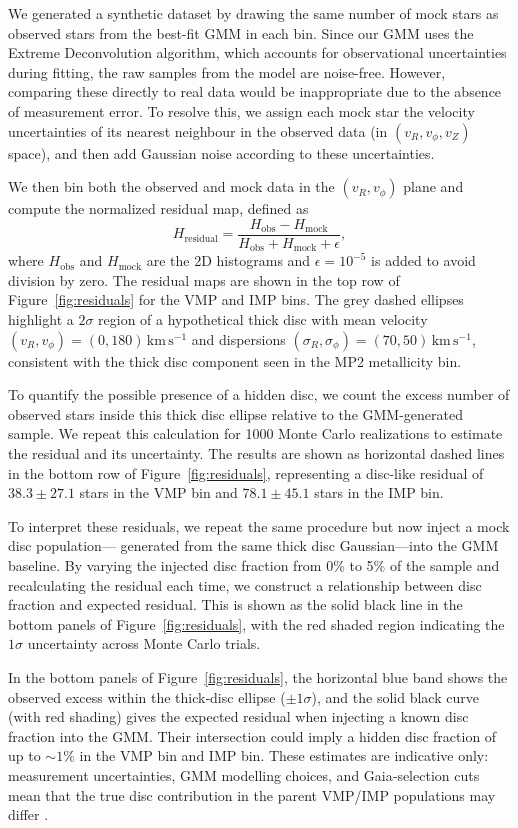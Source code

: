 \documentclass[a4paper,12pt]{article}
\begin{document}
We generated a synthetic dataset by drawing the same number of mock stars as observed stars from 
the best-fit GMM in each bin. Since our GMM uses the Extreme Deconvolution algorithm, which accounts 
for observational uncertainties during fitting, the raw samples from the model are noise-free. 
However, comparing these directly to real data would be inappropriate due to the absence of measurement 
error. To resolve this, we assign each mock star the velocity uncertainties of its nearest neighbour 
in the observed data (in $(v_R, v_\phi, v_Z)$ space), and then add Gaussian noise according to 
these uncertainties.

We then bin both the observed and mock data in the $(v_R, v_\phi)$ plane and compute the 
normalized residual map, defined as
\[
H_{\mathrm{residual}} = \frac{H_{\mathrm{obs}} - H_{\mathrm{mock}}}{H_{\mathrm{obs}} + H_{\mathrm{mock}} + \epsilon},
\]
where $H_{\mathrm{obs}}$ and $H_{\mathrm{mock}}$ are the 2D histograms and $\epsilon = 10^{-5}$ is added 
to avoid division by zero. The residual maps are shown in the top row of Figure~\ref{fig:residuals} for 
the VMP and IMP bins. The grey dashed ellipses highlight a $2\sigma$ region of a hypothetical thick disc 
with mean velocity $(v_R, v_\phi) = (0, 180)\,\mathrm{km\,s^{-1}}$ and dispersions $(\sigma_R, \sigma_\phi) 
= (70, 50)\,\mathrm{km\,s^{-1}}$, consistent with the thick disc component seen in the MP2 metallicity bin.

To quantify the possible presence of a hidden disc, we count the excess number of observed stars inside 
this thick disc ellipse relative to the GMM-generated sample. We repeat this calculation for 1000 Monte 
Carlo realizations to estimate the residual and its uncertainty. The results are shown as horizontal 
dashed lines in the bottom row of Figure~\ref{fig:residuals}, representing a disc-like residual 
of $38.3 \pm 27.1$ stars in the VMP bin and $78.1 \pm 45.1$ stars in the IMP bin.

To interpret these residuals, we repeat the same procedure but now inject a mock disc population—
generated from the same thick disc Gaussian—into the GMM baseline. By varying the injected disc 
fraction from 0\% to 5\% of the sample and recalculating the residual each time, we construct a 
relationship between disc fraction and expected residual. This is shown as the solid black line in the 
bottom panels of Figure~\ref{fig:residuals}, with the red shaded region indicating the $1\sigma$ 
uncertainty across Monte Carlo trials.

In the bottom panels of Figure~\ref{fig:residuals}, the horizontal blue band shows the observed excess 
within the thick‐disc ellipse ($\pm1\sigma$), and the solid black curve (with red shading) gives the expected 
residual when injecting a known disc fraction into the GMM. Their intersection could imply a hidden disc fraction 
of up to $\sim1\%$ in the VMP bin and IMP bin. These estimates are indicative only: 
measurement uncertainties, GMM modelling choices, and Gaia‐selection cuts mean that the true disc 
contribution in the parent VMP/IMP populations may differ \citep{zhang2024existencemetalpoordiscmilky}.  
\end{document}
